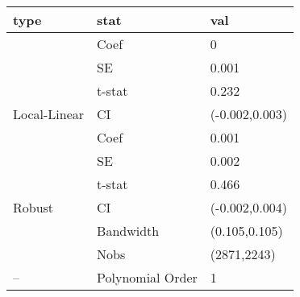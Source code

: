 
\begin{tabular}{lll}
\toprule
type & stat & val\\
\midrule
 & Coef & 0\\

 & SE & 0.001\\

 & t-stat & 0.232\\

\multirow{-4}{*}{\raggedright\arraybackslash Local-Linear} & CI & (-0.002,0.003)\\
\cmidrule{1-3}
 & Coef & 0.001\\

 & SE & 0.002\\

 & t-stat & 0.466\\

\multirow{-4}{*}{\raggedright\arraybackslash Robust} & CI & (-0.002,0.004)\\
\cmidrule{1-3}
 & Bandwidth & (0.105,0.105)\\

 & Nobs & (2871,2243)\\

\multirow{-3}{*}{\raggedright\arraybackslash --} & Polynomial Order & 1\\
\bottomrule
\end{tabular}